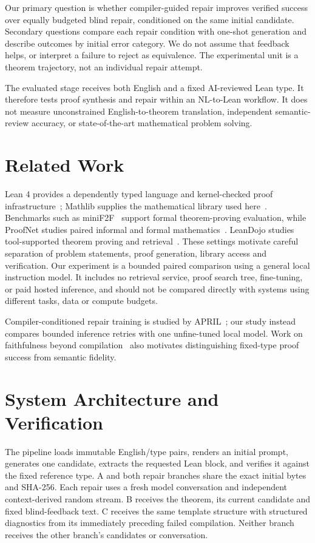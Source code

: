 \documentclass[runningheads,a4paper]{llncs}
\begin{document}
Our primary question is whether compiler-guided repair improves verified
success over equally budgeted blind repair, conditioned on the same initial
candidate. Secondary questions compare each repair condition with one-shot
generation and describe outcomes by initial error category. We do not assume
that feedback helps, or interpret a failure to reject as equivalence. The
experimental unit is a theorem trajectory, not an individual repair attempt.

The evaluated stage receives both English and a fixed AI-reviewed Lean type.
It therefore tests proof synthesis and repair within an NL-to-Lean workflow.
It does not measure unconstrained English-to-theorem translation, independent
semantic-review accuracy, or state-of-the-art mathematical problem solving.

\section{Related Work}
Lean 4 provides a dependently typed language and kernel-checked proof
infrastructure~\cite{demoura2021lean4}; Mathlib supplies the mathematical
library used here~\cite{mathlib2020}. Benchmarks such as
miniF2F~\cite{zheng2022minif2f} support formal theorem-proving evaluation,
while ProofNet studies paired informal and formal
mathematics~\cite{azerbayev2023proofnet}. LeanDojo studies tool-supported
theorem proving and retrieval~\cite{yang2023leandojo}. These settings motivate
careful separation of problem statements, proof generation, library access and
verification. Our experiment is a bounded paired comparison using a general
local instruction model. It includes no retrieval service, proof search tree,
fine-tuning, or paid hosted inference, and should not be compared directly with
systems using different tasks, data or compute budgets.

Compiler-conditioned repair training is studied by APRIL~\cite{wang2026april};
our study instead compares bounded inference retries with one unfine-tuned local
model. Work on faithfulness beyond compilation~\cite{zhang2026beyond} also
motivates distinguishing fixed-type proof success from semantic fidelity.

\section{System Architecture and Verification}
The pipeline loads immutable English/type pairs, renders an initial prompt,
generates one candidate, extracts the requested Lean block, and verifies it
against the fixed reference type. A and both repair branches share the exact
initial bytes and SHA-256. Each repair uses a fresh model conversation and
independent context-derived random stream. B receives the theorem, its current
candidate and fixed blind-feedback text. C receives the same template structure
with structured diagnostics from its immediately preceding failed compilation.
Neither branch receives the other branch's candidates or conversation.
\end{document}
